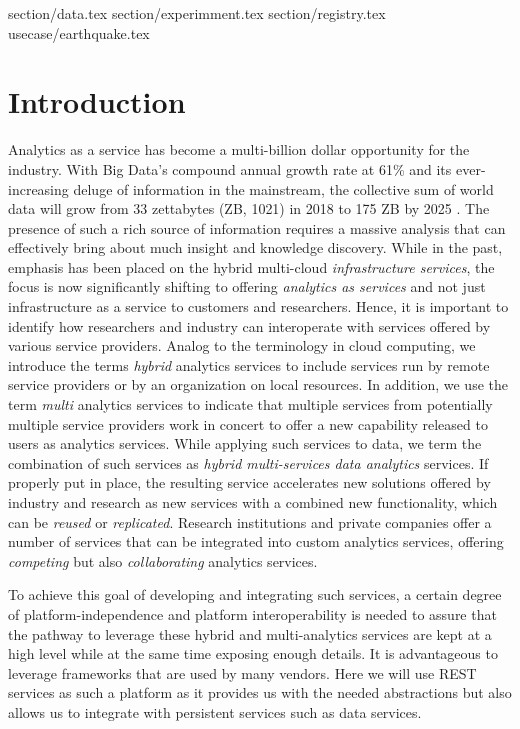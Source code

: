 


section/data.tex
	section/experimment.tex
	section/registry.tex
	usecase/earthquake.tex
\section{Introduction}
\label{sec:summary}


Analytics as a service has become a multi-billion dollar opportunity for the industry. With Big Data's compound annual growth rate at 61\% and its ever-increasing deluge of information in the
mainstream, the collective sum of world data will grow from 33
zettabytes (ZB, 1021) in 2018 to 175 ZB by 2025 \cite{www-idc-forecast}.
The presence of such a rich source
of information requires a massive analysis that can effectively bring
about much insight and knowledge discovery. While in the past, emphasis has been placed on the hybrid multi-cloud {\em infrastructure
services}, the focus is now significantly shifting to offering {\em
analytics as services} and not just infrastructure as a service to
customers and researchers. Hence, it is important to identify how
researchers and industry can interoperate with services offered by
various service providers. Analog to the terminology in cloud
computing, we introduce the terms {\em hybrid} analytics services to
include services run by remote service providers or by an organization
on local resources. In addition, we use the term {\em multi}
analytics services to indicate that multiple services from potentially
multiple service providers work in concert to offer a new capability
released to users as analytics services. While applying such services
to data, we term the combination of such services as {\em hybrid
multi-services data analytics} services. If properly put in place, the
resulting service accelerates new solutions offered by industry and
research as new services with a combined new functionality, which can
be {\em reused} or {\em replicated}. Research institutions and private
companies offer a number of services that can be integrated into
custom analytics services, offering {\em competing} but also {\em
collaborating} analytics services.

To achieve this goal of developing and integrating such services, a certain degree of platform-independence and
platform interoperability is needed to assure that the pathway to
leverage these hybrid and multi-analytics services are kept at a high
level while at the same time exposing enough details. 
It is advantageous to leverage frameworks that are used by many vendors. Here
we will use REST services as such a platform as it provides us with
the needed abstractions but also allows us to integrate with persistent services such as data services.

